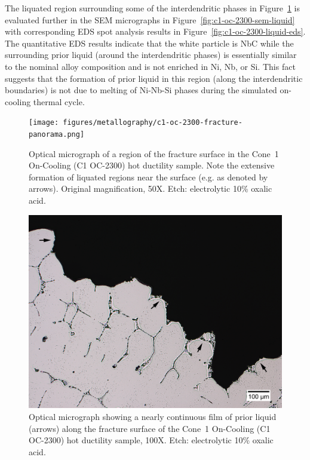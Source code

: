{The liquated region surrounding some of the interdendritic phases in Figure~\ref{fig:c1-oc-2300-fracture-panorama} is evaluated further in the SEM micrographs in Figure~\ref{fig:c1-oc-2300-sem-liquid} with corresponding EDS spot analysis results in Figure~\ref{fig:c1-oc-2300-liquid-eds}. The quantitative EDS results indicate that the white particle is NbC while the surrounding prior liquid (around the interdendritic phases) is essentially similar to the nominal alloy composition and is not enriched in Ni, Nb, or Si. This fact suggests that the formation of prior liquid in this region (along the interdendritic boundaries) is not due to melting of Ni-Nb-Si phases during the simulated on-cooling thermal cycle.

\begin{landscape}
\begin{figure}
    \centering
    \texttt{[image: figures/metallography/c1-oc-2300-fracture-panorama.png]}
    \caption{Optical micrograph of a region of the fracture surface in the Cone~1 On-Cooling \protect{} (C1 OC-2300) hot ductility sample. Note the extensive formation of liquated regions near the surface (e.g. as denoted by arrows). Original magnification, 50X. Etch: electrolytic 10\% oxalic acid.}
    \label{fig:c1-oc-2300-fracture-panorama}
\end{figure}
\end{landscape}

\begin{figure}
    \centering
    \includegraphics[width=4.7in]{figures/metallography/c1-oc-2300-liquation-surface-100x.png}
    \caption{Optical micrograph showing a nearly continuous film of prior liquid (arrows) along the fracture surface of the Cone~1 On-Cooling \protect{} (C1 OC-2300) hot ductility sample, 100X. Etch: electrolytic 10\% oxalic acid.}
    \label{fig:c1-oc-2300-liquation-surface}
\end{figure}

}
